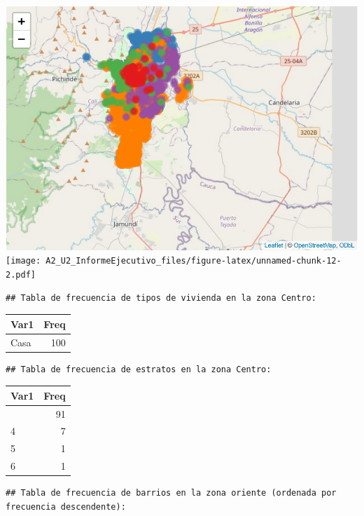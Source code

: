 \documentclass[
]{article}
\begin{document}
\includegraphics{A2_U2_InformeEjecutivo_files/figure-latex/unnamed-chunk-12-1.pdf}
\texttt{[image: A2\_U2\_InformeEjecutivo\_files/figure-latex/unnamed-chunk-12-2.pdf]}

\begin{verbatim}
## Tabla de frecuencia de tipos de vivienda en la zona Centro:
\end{verbatim}

\begin{longtable}[]{@{}lr@{}}
\toprule\noalign{}
Var1 & Freq \\
\midrule\noalign{}
\endhead
\bottomrule\noalign{}
\endlastfoot
Casa & 100 \\
\end{longtable}

\begin{verbatim}
## Tabla de frecuencia de estratos en la zona Centro:
\end{verbatim}

\begin{longtable}[]{@{}lr@{}}
\toprule\noalign{}
Var1 & Freq \\
\midrule\noalign{}
\endhead
\bottomrule\noalign{}
\endlastfoot
3 & 91 \\
4 & 7 \\
5 & 1 \\
6 & 1 \\
\end{longtable}

\begin{verbatim}
## Tabla de frecuencia de barrios en la zona oriente (ordenada por frecuencia descendente):
\end{verbatim}
\end{document}
